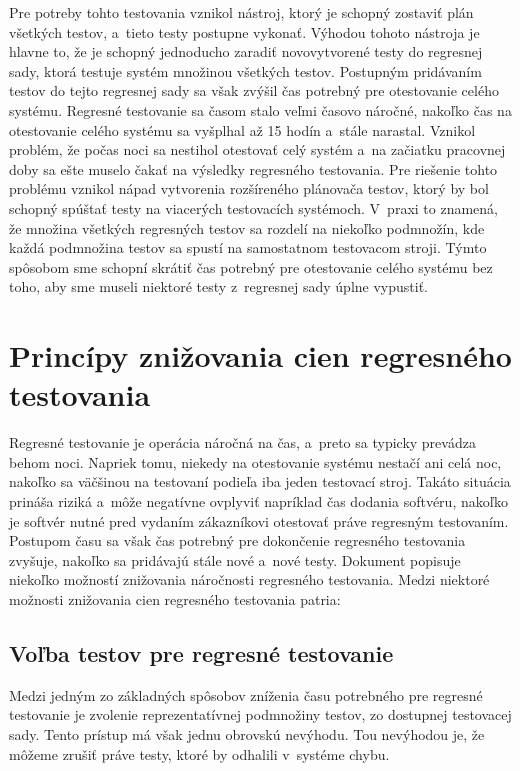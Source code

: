 Pre potreby tohto testovania vznikol nástroj, ktorý je schopný zostaviť plán všetkých testov, a~tieto testy postupne vykonať.
Výhodou tohoto nástroja je hlavne to, že je schopný jednoducho zaradiť novovytvorené testy do regresnej sady, ktorá
testuje systém množinou všetkých testov. Postupným pridávaním testov do tejto regresnej sady sa však zvýšil čas potrebný pre otestovanie celého systému.
Regresné testovanie sa časom stalo veľmi časovo náročné, nakoľko čas na otestovanie celého systému sa vyšplhal až 15 hodín a~stále narastal.
Vznikol problém, že počas noci sa nestihol otestovať celý systém a~na začiatku pracovnej doby sa ešte muselo čakať na výsledky regresného testovania.
Pre riešenie tohto problému vznikol nápad vytvorenia rozšíreného plánovača testov, ktorý by bol schopný spúštať testy na viacerých testovacích systémoch.
V~praxi to znamená, že množina všetkých regresných testov sa rozdelí na niekoľko podmnožín, kde každá podmnožina testov sa spustí na samostatnom
testovacom stroji. Týmto spôsobom sme schopní skrátiť čas potrebný pre otestovanie celého systému bez toho, aby sme museli niektoré testy z~regresnej sady 
úplne vypustiť. 



\section{Princípy znižovania cien regresného testovania}
\label{sekcia:principy_znizovania_cien}
Regresné testovanie je operácia náročná na čas, a~preto sa typicky prevádza behom noci.
Napriek tomu, niekedy na otestovanie systému nestačí ani celá noc, nakoľko sa väčšinou na testovaní
podieľa iba jeden testovací stroj. Takáto situácia prináša riziká a~môže negatívne ovplyviť 
napríklad čas dodania softvéru, nakoľko je softvér nutné pred vydaním zákazníkovi otestovať práve
regresným testovaním. Postupom času sa však čas potrebný pre dokončenie regresného testovania zvyšuje,
nakoľko sa pridávajú stále nové a~nové testy. Dokument \cite{Parallel_approach} popisuje niekoľko možností znižovania náročnosti
regresného testovania.
Medzi niektoré možnosti znižovania cien regresného testovania patria:

\subsection*{Voľba testov pre regresné testovanie}
Medzi jedným zo základných spôsobov zníženia času potrebného pre regresné testovanie je zvolenie reprezentatívnej
podmnožiny testov, zo dostupnej testovacej sady. Tento prístup má však jednu obrovskú nevýhodu. 
Tou nevýhodou je, že môžeme zrušiť práve testy, ktoré by odhalili v~systéme chybu. 

